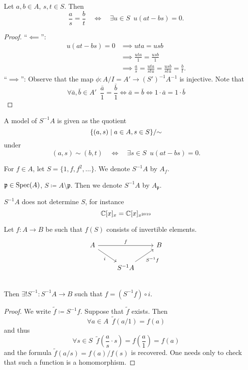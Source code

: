 \begin{lemma}
  Let $a, b \in A$, $s, t \in S$. Then
  \[ \frac{a}{s} = \frac{b}{t} \quad \iff \quad \exists u \in S \enspace u(at-bs)=0.\]
\end{lemma}
\begin{proof}
  ``$\impliedby$'':
  \begin{align*}
    u(at - bs) = 0 & \implies uta = usb \\
                   & \implies \frac{uta}{1} = \frac{usb}{1} \\
                   & \implies  \frac{a}{s} = \frac{uta}{stu} = \frac{usb}{stu} = \frac{b}{t}.
  \end{align*}
  ``$\implies$'': Observe that the map $\phi: A /{I} = A' \to (S')^{-1}A^{-1}$ is injective.
  Note that
  \[ \forall \bar a, \bar b \in A' \enspace \frac{\bar a}{1} = \frac{\bar b}{1} \iff \bar a = \bar b \iff 1 \cdot \bar a = 1 \cdot \bar b \]
\end{proof}

\begin{corollary}
  A model of $S^{-1}A$ is given as the quotient
  \[ \{ (a, s) \mathrel{|} a \in A, s \in S \} /{\sim}\]
  under
  \[ (a, s) \sim (b, t) \quad \iff \quad \exists s \in S \enspace u(at - bs) = 0.\]
\end{corollary}

\begin{example}
  For $f \in A$, let $S = \{ 1, f, f^2, \ldots \}$. We denote $S^{-1}A$ by $A_f$.
\end{example}

\begin{example}
  $\mathfrak p \in \text{Spec}(A)$,
  $S \coloneqq A \setminus \mathfrak p$.
  Then we denote $S^{-1}A$ by $A_{\mathfrak p}$.
\end{example}

\begin{note}
  $S^{-1}A$ does not determine $S$, for instance
  \[ \mathbb C [x]_x = \mathbb C [x]_{x^{2019}} \]
\end{note}

\begin{prop}
  \label{loc-univ}
  Let $f: A \to B$ be such that $f(S)$ consists of invertible elements.
\begin{equation*}
  \begin{tikzcd}
    A \arrow{rr}{f} \arrow[swap]{dr}{i}
    & & B \\
    & S^{-1}A \arrow{ru}[swap]{S^{-1}f}
    & \\
  \end{tikzcd}
  \end{equation*}
  Then $\exists ! S^{-1} \colon S^{-1}A \to B$
  such that
  $f = (S^{-1}f) \circ i$.
\end{prop}
\begin{proof}
  We write $\tilde f \coloneqq S^{-1}f$. Suppose that $\tilde f$ exists. Then
  \[ \forall a \in A \enspace \tilde f (a / 1) = f(a) \]
  and thus
  \[ \forall s \in S \enspace \tilde f(\frac{a}{s} \cdot s) = f(\frac{a}{1}) = f(a) \]
  and the formula
  $\tilde{f}(a / s) = f(a) / f(s)$
  is recovered.
  One needs only to check that such a function is a homomorphism.
\end{proof}

